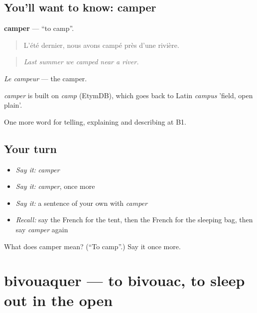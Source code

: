 \subsection*{You'll want to know: camper}
\textbf{camper} — \textquotedblleft{}to camp\textquotedblright{}.

\begin{quote}
L'été dernier, nous avons campé près d'une rivière.
\end{quote}

\begin{quote}
\emph{Last summer we camped near a river.}
\end{quote}

\emph{Le campeur} — the camper.

\begin{cousinweb}
\emph{camper} is built on \emph{camp} (EtymDB), which goes back to Latin \emph{campus} 'field, open plain'.
\end{cousinweb}

\begin{grammarlens}[title={What you've built}]
One more word for telling, explaining and describing at B1.
\end{grammarlens}

\subsection*{Your turn}
\begin{itemize}
\raggedright
  \item \emph{Say it:} \emph{camper}
  \item \emph{Say it:} \emph{camper}, once more
  \item \emph{Say it:} a sentence of your own with \emph{camper}
  \item \emph{Recall:} say the French for the tent, then the French for the sleeping bag, then say \emph{camper} again
\end{itemize}

\begin{tcolorbox}[breakable,colback=teal!4,colframe=teal!35!black,title={Before you move on}]
What does camper mean? (\textquotedblleft{}To camp\textquotedblright{}.) Say it once more.
\end{tcolorbox}
\section[bivouaquer]{bivouaquer — to bivouac, to sleep out in the open}

